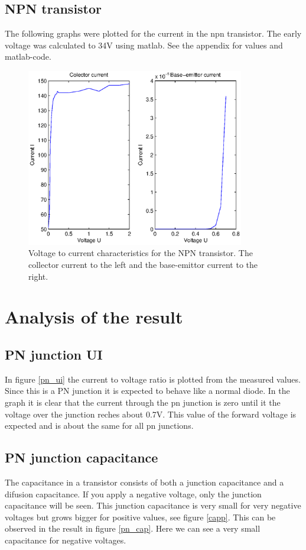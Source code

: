 \documentclass[a4paper]{article}
\begin{document}
\subsection{NPN transistor}
The following graphs were plotted for the current in the npn transistor. The early voltage was calculated to 34V using matlab. See the appendix for values and matlab-code.
\begin{figure}[H]
	\centering
	\includegraphics[width=0.85\textwidth]{npn.eps}
	\caption{Voltage to current characteristics for the NPN transistor. The collector current to the left and the base-emittor current to the right.}	
	\label{npn}
\end{figure}

\newpage
\section{Analysis of the result}
\subsection{PN junction UI}
In figure \ref{pn_ui} the current to voltage ratio is plotted from the measured values. Since this is a PN junction it is expected to behave like a normal diode. In the graph it is clear that the current through the pn junction is zero until it the voltage over the junction reches about 0.7V. This value of the forward voltage is expected and is about the same for all pn junctions.

\subsection{PN junction capacitance}
The capacitance in a transistor consists of both a junction capacitance and a difusion capacitance. If you apply a negative voltage, only the junction capacitance will be seen. This junction capacitance is very small for very negative voltages but grows bigger for positive values, see figure \ref{capp}. This can be observed in the result in figure \ref{pn_cap}. Here we can see a very small capacitance for negative voltages.
\end{document}
